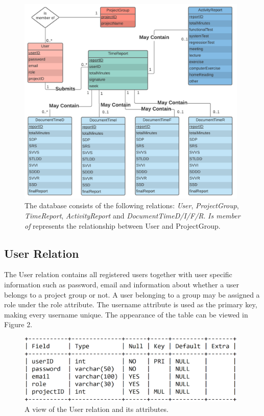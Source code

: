 \documentclass{article}
\begin{document}
\begin{figure}[H]
     \centering
     \includegraphics[width=11cm]{images/PUSPERdiagramVers3_2.png}
     \renewcommand\figurename{Figure}
     \caption{The database consists of the following relations: \emph{User}, \emph{ProjectGroup}, \emph{TimeReport}, \emph{ActivityReport} and \emph{DocumentTimeD/I/F/R}. \emph{Is member of} represents the relationship between User and ProjectGroup.}
     \label{fig:my_label}
 \end{figure}

\subsection{User Relation}
The User relation contains all registered users together with user specific information such as password, email and information about whether a user belongs to a project group or not. A user belonging to a group may be assigned a role under the role attribute. The username attribute is used as the primary key, making every username unique. The appearance of the table can be viewed in Figure 2.

\begin{figure}[H]
     \centering
     \includegraphics[width=11cm]{images/SQL_tables/user.png}
     \renewcommand\figurename{Figure}
     \caption{A view of the User relation and its attributes.}
     \label{fig:my_label}
 \end{figure}
\end{document}
